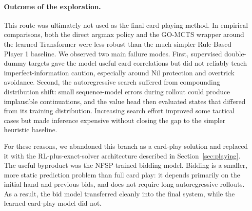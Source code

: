 \documentclass{article}
\begin{document}
\paragraph{Outcome of the exploration.}
This route was ultimately not used as the final card-playing method. In empirical comparisons, both the direct argmax policy and the GO-MCTS wrapper around the learned Transformer were less robust than the much simpler Rule-Based Player 1 baseline. We observed two main failure modes. First, supervised double-dummy targets gave the model useful card correlations but did not reliably teach imperfect-information caution, especially around Nil protection and overtrick avoidance. Second, the autoregressive search suffered from compounding distribution shift: small sequence-model errors during rollout could produce implausible continuations, and the value head then evaluated states that differed from its training distribution. Increasing search effort improved some tactical cases but made inference expensive without closing the gap to the simpler heuristic baseline.

For these reasons, we abandoned this branch as a card-play solution and replaced it with the RL-plus-exact-solver architecture described in Section~\ref{sec:playing}. The useful byproduct was the NFSP-trained bidding model. Bidding is a smaller, more static prediction problem than full card play: it depends primarily on the initial hand and previous bids, and does not require long autoregressive rollouts. As a result, the bid model transferred cleanly into the final system, while the learned card-play model did not.



\end{document}

